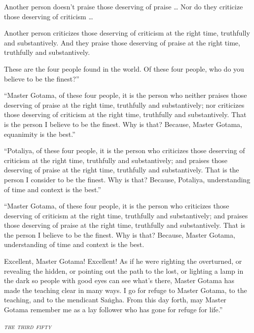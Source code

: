 \documentclass[12pt,openany]{book}%
\let\oldcontentsline\contentsline
\newcommand{\nopagecontentsline}[3]{\oldcontentsline{#1}{#2}{}}
\newcommand*{\pannasa}[1]{\clearpage\thispagestyle{empty}\begin{center}\vspace*{14em}\setstretch{.85}\huge\itshape\scshape\MakeLowercase{#1}\end{center}}
\begin{document}
Another person doesn’t praise those deserving of praise … Nor do they criticize those deserving of criticism … 

Another person criticizes those deserving of criticism at the right time, truthfully and substantively. And they praise those deserving of praise at the right time, truthfully and substantively. 

These are the four people found in the world. Of these four people, who do you believe to be the finest?” 

“Master Gotama, of these four people, it is the person who neither praises those deserving of praise at the right time, truthfully and substantively; nor criticizes those deserving of criticism at the right time, truthfully and substantively. That is the person I believe to be the finest. Why is that? Because, Master Gotama, equanimity is the best.” 

“Potaliya, of these four people, it is the person who criticizes those deserving of criticism at the right time, truthfully and substantively; and praises those deserving of praise at the right time, truthfully and substantively. That is the person I consider to be the finest. Why is that? Because, Potaliya, understanding of time and context is the best.” 

“Master Gotama, of these four people, it is the person who criticizes those deserving of criticism at the right time, truthfully and substantively; and praises those deserving of praise at the right time, truthfully and substantively. That is the person I believe to be the finest. Why is that? Because, Master Gotama, understanding of time and context is the best. 

Excellent, Master Gotama! Excellent! As if he were righting the overturned, or revealing the hidden, or pointing out the path to the lost, or lighting a lamp in the dark so people with good eyes can see what’s there, Master Gotama has made the teaching clear in many ways. I go for refuge to Master Gotama, to the teaching, and to the mendicant \textsanskrit{Saṅgha}. From this day forth, may Master Gotama remember me as a lay follower who has gone for refuge for life.” 

%
\pannasa{The Third Fifty }
\markboth{}{}
\addtocontents{toc}{\let\protect\contentsline\protect\oldcontentsline}
\end{document}
